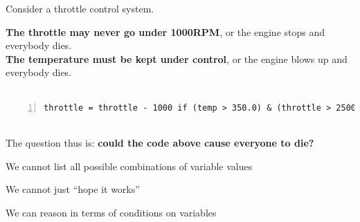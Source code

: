 \documentclass{beamer}
\begin{document}
\begin{frame}[fragile]
Consider a throttle control system. 

\textbf{The throttle may never go under 1000RPM}, or the engine stops and everybody dies. \\

\textbf{The temperature must be kept under control}, or the engine blows up and everybody dies. \\

\ \\
\begin{lstlisting}[frame=shadowbox,numbers=left]
throttle = throttle - 1000 if (temp > 350.0) & (throttle > 2500) else throttle
\end{lstlisting}

\ \\

The question thus is: \textbf{could the code above cause everyone to die?}

\end{frame}


\begin{slide}{
\item We cannot list all possible combinations of variable values
\item We cannot just ``hope it works''
\pause
\item We can reason in terms of conditions on variables
}\end{slide}
\end{document}

